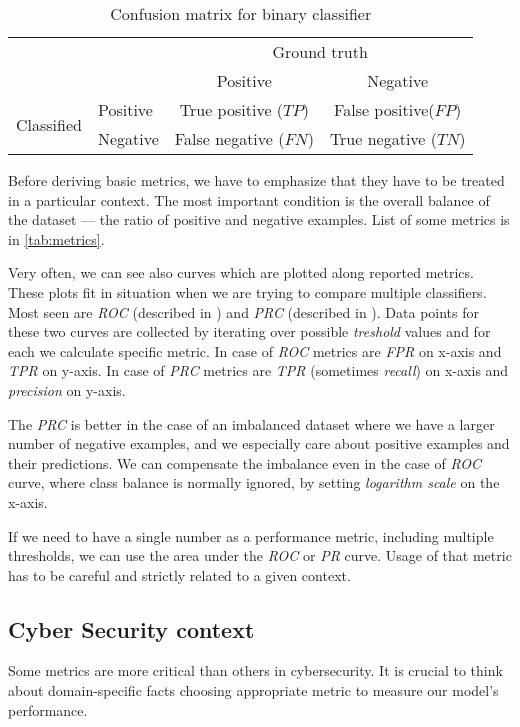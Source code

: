 \begin{table}[h]
    \centering
    \caption{Confusion matrix for binary classifier}
        \begin{tabular}{l|l|c|c|}
        \multicolumn{2}{c}{}&\multicolumn{2}{c}{Ground truth}\\
        \cline{3-4}
        \multicolumn{2}{c|}{}&Positive&Negative\\
        \cline{2-4}
        \multirow{2}{*}{Classified}& Positive & True positive ($TP$) & False positive($FP$)\\
        \cline{2-4}
        & Negative & False negative ($FN$) & True negative ($TN$)\\
        \cline{2-4}
        \end{tabular}
    \label{tab:confmatrix}
  \end{table}

Before deriving basic metrics, we have to emphasize that they have to be treated in a particular context. The most important condition is the overall balance of the dataset --- the ratio of positive and negative examples. List of some metrics is in \ref{tab:metrics}.

Very often, we can see also curves which are plotted along reported metrics. These plots fit in situation when we are trying to compare multiple classifiers. Most seen are \emph{ROC} (described in \cite{Fawcett2006}) and \emph{PRC} (described in \cite{Flach2015}). Data points for these two curves are collected by iterating over possible \emph{treshold} values and for each we calculate specific metric. In case of \emph{ROC} metrics are \emph{FPR} on x-axis and \emph{TPR} on y-axis. In case of \emph{PRC} metrics are \emph{TPR} (sometimes \emph{recall}) on x-axis and \emph{precision} on y-axis.

The \emph{PRC} is better in the case of an imbalanced dataset where we have a larger number of negative examples, and we especially care about positive examples and their predictions. We can compensate the imbalance even in the case of \emph{ROC} curve, where class balance is normally ignored, by setting \emph{logarithm scale} on the x-axis.

If we need to have a single number as a performance metric, including multiple thresholds, we can use the area under the \emph{ROC} or \emph{PR} curve. Usage of that metric has to be careful and strictly related to a given context.

\subsection*{Cyber Security context}
Some metrics are more critical than others in cybersecurity. It is crucial to think about domain-specific facts choosing appropriate metric to measure our model's performance.

